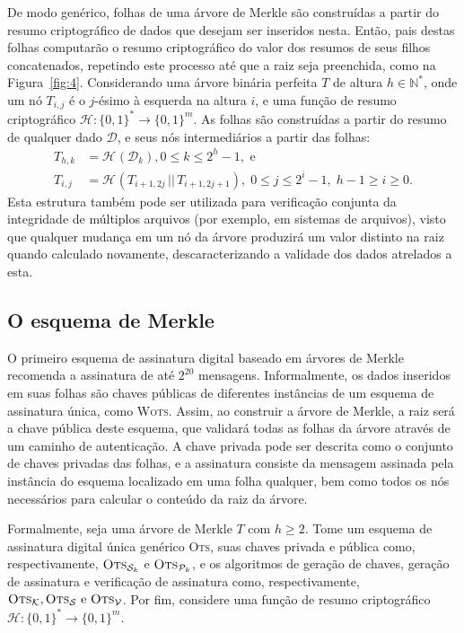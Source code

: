 \documentclass[12pt]{report}
\newcommand{\hh}{\mathcal{H}}
\newcommand{\pk}{\mathcal{P}_k}
\newcommand{\sk}{\mathcal{S}_k}
\newcommand{\hash}[2][]{\mathcal{H}^{#1}(#2)}
\newcommand{\concat}{\, \vert \vert \,}
\newcommand{\binwds}[1]{\{0, 1\}^{#1}}
\newcommand{\fhash}[1]{\hh{} : \binwds{*} \longrightarrow \binwds{#1}}
\begin{document}
De modo genérico, folhas de uma árvore de Merkle são construídas a partir do
resumo criptográfico de dados que desejam ser inseridos nesta. Então, pais
destas folhas computarão o resumo criptográfico do valor dos resumos de seus
filhos concatenados, repetindo este processo até que a raiz seja preenchida,
como na Figura~\ref{fig:4}. Considerando uma árvore binária perfeita $T$ de
altura $h \in \mathbb{N}^{*}$, onde um nó $T_{i,j}$ é o $j$-ésimo à esquerda na
altura $i$, e uma função de resumo criptográfico $\fhash{m}$. As folhas são
construídas a partir do resumo de qualquer dado $\mathcal{D}$, e seus nós
intermediários a partir das folhas:
\begin{equation}
  \begin{split}
    T_{h, k} &= \hash{\mathcal{D}_k}, 0 \leq k \leq 2^{h} - 1, \text{ e } \\
    T_{i, j} &= \hash{T_{i + 1, 2j} \concat T_{i + 1, 2j + 1}},
      \; 0 \leq j \leq 2^{i} - 1, \; h - 1 \geq i \geq 0.
  \end{split}
\end{equation}
Esta estrutura também pode ser utilizada para verificação conjunta da
integridade de múltiplos arquivos (por exemplo, em sistemas de arquivos),
visto que qualquer mudança em um nó da
árvore produzirá um valor distinto na raiz quando calculado novamente,
descaracterizando a validade dos dados atrelados a esta.

\subsection{O esquema de Merkle}

O primeiro esquema de assinatura digital baseado em árvores de Merkle
\cite{Merkle:1989:CDS:118209.118230} recomenda a assinatura de até $2^{20}$
mensagens. Informalmente, os dados inseridos em suas folhas são chaves públicas
de diferentes instâncias de um esquema de assinatura única, como \textsc{Wots}.
Assim, ao construir a árvore de Merkle, a raiz será a chave pública deste
esquema, que validará todas as folhas da árvore através de um caminho de
autenticação. A chave privada pode ser descrita como o conjunto de chaves
privadas das folhas, e a assinatura consiste da mensagem assinada pela
instância do esquema localizado em uma folha qualquer, bem como todos os nós
necessários para calcular o conteúdo da raiz da árvore.

Formalmente, seja uma árvore de Merkle $T$ com $h \geq 2$. Tome um esquema de
assinatura digital única genérico \textsc{Ots}, suas chaves privada e pública
como, respectivamente, $\textsc{Ots}_{\sk{}}$ e $\textsc{Ots}_{\pk{}}$, e os
algoritmos de geração de chaves, geração de assinatura e verificação de
assinatura como, respectivamente, $\textsc{Ots}_\mathcal{K},
\textsc{Ots}_\mathcal{S} \text{ e } \textsc{Ots}_\mathcal{V}$. Por fim,
considere uma função de resumo criptográfico $\fhash{m}$.
\end{document}
